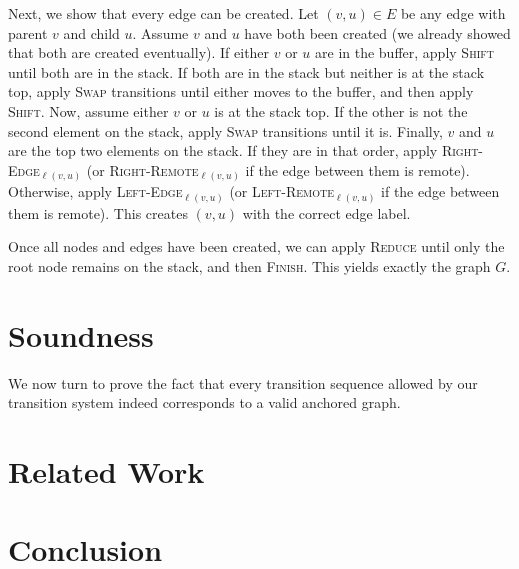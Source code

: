 \documentclass[11pt,a4paper]{article}
\begin{document}
Next, we show that every edge can be created.
Let $(v,u) \in E$ be any edge with parent $v$ and child $u$.
Assume $v$ and $u$ have both been created (we already showed that both are created eventually).
If either $v$ or $u$ are in the buffer, apply \textsc{Shift} until both are in the stack.
If both are in the stack but neither is at the stack top, apply \textsc{Swap} transitions
until either moves to the buffer, and then apply \textsc{Shift}.
Now, assume either $v$ or $u$ is at the stack top.
If the other is not the second element on the stack, apply \textsc{Swap} transitions until it is.
Finally, $v$ and $u$ are the top two elements on the stack.
If they are in that order, apply \textsc{Right-Edge}$_{\ell(v,u)}$
(or \textsc{Right-Remote}$_{\ell(v,u)}$ if the edge between them is remote).
Otherwise, apply \textsc{Left-Edge}$_{\ell(v,u)}$
(or \textsc{Left-Remote}$_{\ell(v,u)}$ if the edge between them is remote).
This creates $(v,u)$ with the correct edge label.

Once all nodes and edges have been created, we can apply \textsc{Reduce} until only the
root node remains on the stack, and then \textsc{Finish}.
This yields exactly the graph $G$.


\section{Soundness}\label{sec:soundness}

We now turn to prove the fact that every transition sequence allowed by our transition system
indeed corresponds to a valid anchored graph.



\section{Related Work}\label{sec:related_work}



\section{Conclusion}\label{sec:conclusion}



%




\end{document}
